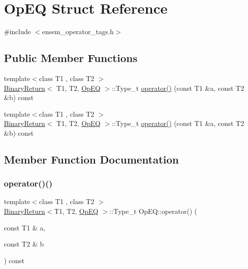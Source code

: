 \hypertarget{structOpEQ}{}\section{Op\+EQ Struct Reference}
\label{structOpEQ}


{\ttfamily \#include $<$ensem\+\_\+operator\+\_\+tags.\+h$>$}

\subsection*{Public Member Functions}
\begin{DoxyCompactItemize}
\item 
{\footnotesize template$<$class T1 , class T2 $>$ }\\\mbox{\hyperlink{structBinaryReturn}{Binary\+Return}}$<$ T1, T2, \mbox{\hyperlink{structOpEQ}{Op\+EQ}} $>$\+::Type\+\_\+t \mbox{\hyperlink{structOpEQ_aadd4c1f0508ded0e1ad084d0a724f912}{operator()}} (const T1 \&a, const T2 \&b) const
\item 
{\footnotesize template$<$class T1 , class T2 $>$ }\\\mbox{\hyperlink{structBinaryReturn}{Binary\+Return}}$<$ T1, T2, \mbox{\hyperlink{structOpEQ}{Op\+EQ}} $>$\+::Type\+\_\+t \mbox{\hyperlink{structOpEQ_aadd4c1f0508ded0e1ad084d0a724f912}{operator()}} (const T1 \&a, const T2 \&b) const
\end{DoxyCompactItemize}


\subsection{Member Function Documentation}
\mbox{\label{structOpEQ_aadd4c1f0508ded0e1ad084d0a724f912}} 
\subsubsection{\texorpdfstring{operator()()}{operator()()}\hspace{0.1cm}{\footnotesize\ttfamily [1/2]}}
{\footnotesize\ttfamily template$<$class T1 , class T2 $>$ \\
\mbox{\hyperlink{structBinaryReturn}{Binary\+Return}}$<$T1, T2, \mbox{\hyperlink{structOpEQ}{Op\+EQ}} $>$\+::Type\+\_\+t Op\+E\+Q\+::operator() (\begin{DoxyParamCaption}\item[{const T1 \&}]{a,  }\item[{const T2 \&}]{b }\end{DoxyParamCaption}) const\hspace{0.3cm}{\ttfamily [inline]}}

